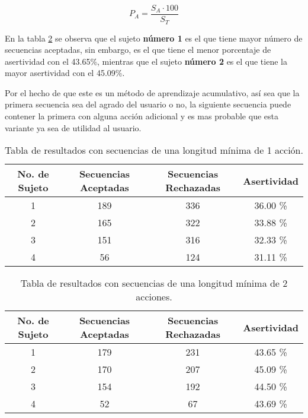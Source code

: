 \begin{equation}
P_A = \dfrac{ S_A \cdot 100}{S_T}
\label{eqAsertividad}
\end{equation}
 
 
En la tabla \ref{tableRes2} se observa que el sujeto \textbf{n\'umero 1} es 
 el que tiene mayor n\'umero de secuencias aceptadas, sin embargo, es el que 
 tiene el menor porcentaje de asertividad con el 43.65\%, mientras que el 
 sujeto \textbf{n\'umero 2} es el que tiene la mayor asertividad con el 
 45.09\%.


Por el hecho de que este es un m\'etodo de aprendizaje acumulativo, as\'i sea
 que la primera secuencia sea del agrado del usuario o no, la siguiente 
 secuencia puede contener la primera con alguna acci\'on adicional y es mas 
 probable que esta variante ya sea de utilidad al usuario. 


\begin{table}[]
\centering
\begin{tabular}{cccc}
\hline
No. de Sujeto	
&	Secuencias Aceptadas	
&   Secuencias Rechazadas	
&	Asertividad		\\ \hline

1				
&	189						
&	336						
&	36.00 \%		\\

2				
&	165						
&	322						
&	33.88 \%		\\

3
&	151
&	316
&	32.33 \%		\\

4
&	56
&	124
&	31.11 \%		\\
\hline
\end{tabular}
\caption{Tabla de resultados con secuencias de una longitud m\'inima de 
 1 acci\'on.}
\label{tableRes1}
\end{table}


\begin{table}[]
\centering
\begin{tabular}{cccc}
\hline
No. de Sujeto
&	Secuencias Aceptadas
&   Secuencias Rechazadas
&	Asertividad		\\ \hline

1
&	179
&	231
&	43.65 \%		\\
	
2
&	170
&	207
&	45.09 \%		\\

3
&	154
&	192
&	44.50 \%		\\

4
&	52
&	67
&	43.69 \%		\\
\hline
\end{tabular}
\caption{Tabla de resultados con secuencias de una longitud m\'inima de 
 2 acciones.}
\label{tableRes2}
\end{table}


